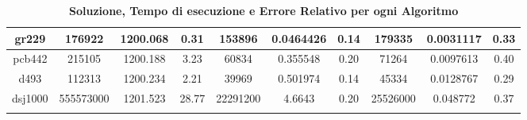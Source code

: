 \begin{longtable}{|c|c|c|c|c|c|c|c|c|c|}
gr229        & 176922             & 1200.068           & 0.31          & 153896             & 0.0464426          & 0.14          & 179335             & 0.0031117          & 0.33          \\ \hline
pcb442       & 215105             & 1200.188           & 3.23          & 60834              & 0.355548           & 0.20          & 71264              & 0.0097613          & 0.40          \\ \hline
d493         & 112313             & 1200.234           & 2.21          & 39969              & 0.501974           & 0.14          & 45334              & 0.0128767          & 0.29          \\ \hline
dsj1000      & 555573000          & 1201.523           & 28.77         & 22291200           & 4.6643             & 0.20          & 25526000           & 0.048772           & 0.37          \\ \hline
\caption{\textbf{Soluzione, Tempo di esecuzione e Errore Relativo per ogni Algoritmo}}
\end{longtable}